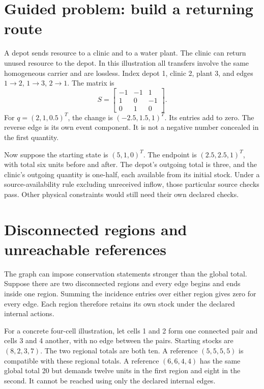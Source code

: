 \section{Guided problem: build a returning route}
A depot sends resource to a clinic and to a water plant. The clinic can return unused resource to the depot. In this illustration all transfers involve the same homogeneous carrier and are lossless. Index depot 1, clinic 2, plant 3, and edges \(1\to2\), \(1\to3\), \(2\to1\). The matrix is
\begin{equation}
 S=\begin{bmatrix}-1&-1&1\\1&0&-1\\0&1&0\end{bmatrix}.
\end{equation}
For \(q=(2,1,0.5)^T\), the change is \((-2.5,1.5,1)^T\). Its entries add to zero. The reverse edge is its own event component. It is not a negative number concealed in the first quantity.

Now suppose the starting state is \((5,1,0)^T\). The endpoint is \((2.5,2.5,1)^T\), with total six units before and after. The depot's outgoing total is three, and the clinic's outgoing quantity is one-half, each available from its initial stock. Under a source-availability rule excluding unreceived inflow, those particular source checks pass. Other physical constraints would still need their own declared checks.

\section{Disconnected regions and unreachable references}
The graph can impose conservation statements stronger than the global total. Suppose there are two disconnected regions and every edge begins and ends inside one region. Summing the incidence entries over either region gives zero for every edge. Each region therefore retains its own stock under the declared internal actions.

For a concrete four-cell illustration, let cells 1 and 2 form one connected pair and cells 3 and 4 another, with no edge between the pairs. Starting stocks are \((8,2,3,7)\). The two regional totals are both ten. A reference \((5,5,5,5)\) is compatible with these regional totals. A reference \((6,6,4,4)\) has the same global total 20 but demands twelve units in the first region and eight in the second. It cannot be reached using only the declared internal edges.

